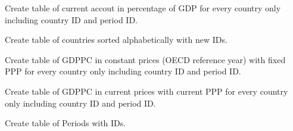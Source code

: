 \documentclass[a4paper,11pt,english]{sphinxmanual}
\begin{document}
\begin{fulllineitems}
\label{data_management:src.data_management.clean_raw_data.create_ca_percentage_gdp_table}
Create table of current accout in percentage of GDP for every country
only including country ID and period ID.

\end{fulllineitems}


\begin{fulllineitems}
\label{data_management:src.data_management.clean_raw_data.create_country_table}
Create table of countries sorted alphabetically with new IDs.

\end{fulllineitems}


\begin{fulllineitems}
\label{data_management:src.data_management.clean_raw_data.create_gdppc_const_prices_table}
Create table of GDPPC in constant prices (OECD reference year)
with fixed PPP for every country only including
country ID and period ID.

\end{fulllineitems}


\begin{fulllineitems}
\label{data_management:src.data_management.clean_raw_data.create_gdppc_current_prices_table}
Create table of GDPPC in current prices with current PPP for every country
only including country ID and period ID.

\end{fulllineitems}


\begin{fulllineitems}
\label{data_management:src.data_management.clean_raw_data.create_period_table}
Create table of Periods with IDs.

\end{fulllineitems}
\end{document}
